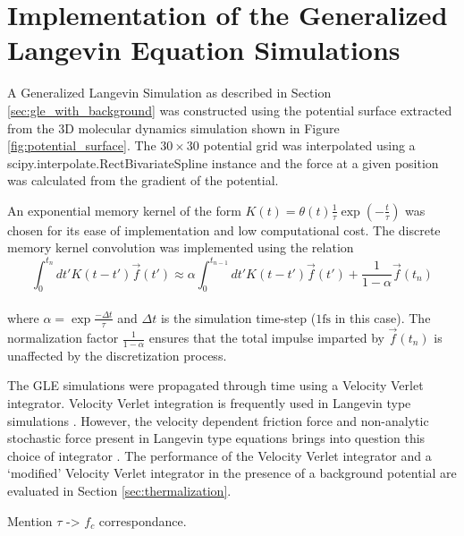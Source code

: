 \section{Implementation of the Generalized Langevin Equation Simulations}

A Generalized Langevin Simulation as described in Section \ref{sec:gle_with_background} was constructed using the potential surface extracted from the 3D molecular dynamics simulation shown in Figure \ref{fig:potential_surface}. The $30\times30$ potential grid was interpolated using a scipy.interpolate.RectBivariateSpline \cite{2020SciPy-NMeth} instance and the force at a given position was calculated from the gradient of the potential. 

An exponential memory kernel of the form $K\left(t\right) = \theta(t)\frac{1}{\tau}\exp\left(-\frac{t}{\tau}\right)$ was chosen for its ease of implementation and low computational cost. The discrete memory kernel convolution was implemented using the relation
\\
$$
\int_0^{t_n} dt' K\left(t-t'\right) \vec{f}(t') \approx \alpha \int_0^{t_{n-1}} dt' K\left(t-t'\right) \vec{f}(t') + \frac{1}{1-\alpha} \vec{f}\left(t_n\right)
$$
\\
where $\alpha = \exp{\frac{-\Delta{t}}{\tau}}$ and $\Delta{t}$ is the simulation time-step ($1\si{\femto\second}$ in this case). The normalization factor $\frac{1}{1-\alpha}$ ensures that the total impulse imparted by $\vec{f}(t_n)$ is unaffected by the discretization process. 

The GLE simulations were propagated through time using a Velocity Verlet integrator. Velocity Verlet integration is frequently used in Langevin type simulations \cite{Ward, Townsend}. However, the velocity dependent friction force and non-analytic stochastic force present in Langevin type equations brings into question this choice of integrator \cite{gronbech2013simple}. The performance of the Velocity Verlet integrator and a `modified' Velocity Verlet integrator \cite{Omelyan} in the presence of a background potential are evaluated in Section \ref{sec:thermalization}.

Mention $\tau$ -> $f_c$ correspondance.

